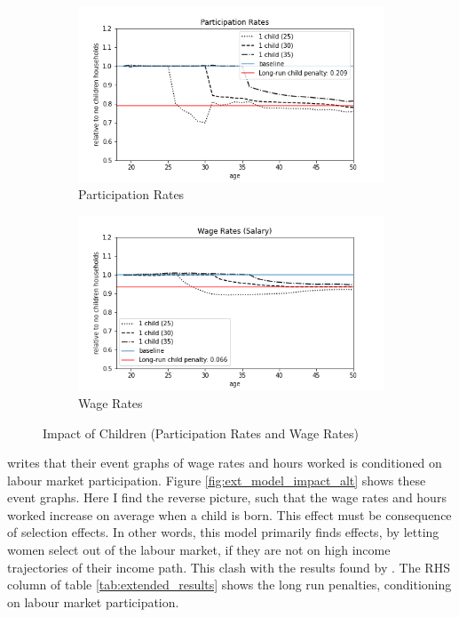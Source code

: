 \begin{figure}[ht]
\begin{subfigure}{.5\textwidth}
  \centering
  \includegraphics[width=1\linewidth]{figures/extended_model_event_participation_rates.png}
  \caption{Participation Rates}
  \label{fig:ext_model_event_partipation}
\end{subfigure}%
\begin{subfigure}{.5\textwidth}
  \centering
  \includegraphics[width=1\linewidth]{figures/extended_model_event_wage_rates.png}
  \caption{Wage Rates}
  \label{fig:ext_model_event_wage_rates}
\end{subfigure}
    \caption{Impact of Children (Participation Rates and Wage Rates)}
    \label{fig:ext_model_impact_participation_wage}
\end{figure}


\textcite{kleven_children_2019} writes that their event graphs of wage rates and hours worked is conditioned on labour market participation. Figure \ref{fig:ext_model_impact_alt} shows these event graphs. Here I find the reverse picture, such that the wage rates and hours worked increase on average when a child is born. This effect must be consequence of selection effects. In other words, this model primarily finds effects, by letting women select out of the labour market, if they are not on high income trajectories of their income path. This clash with the results found by \textcite{kleven_children_2019}. The RHS column of table \ref{tab:extended_results} shows the long run penalties, conditioning on labour market participation.


